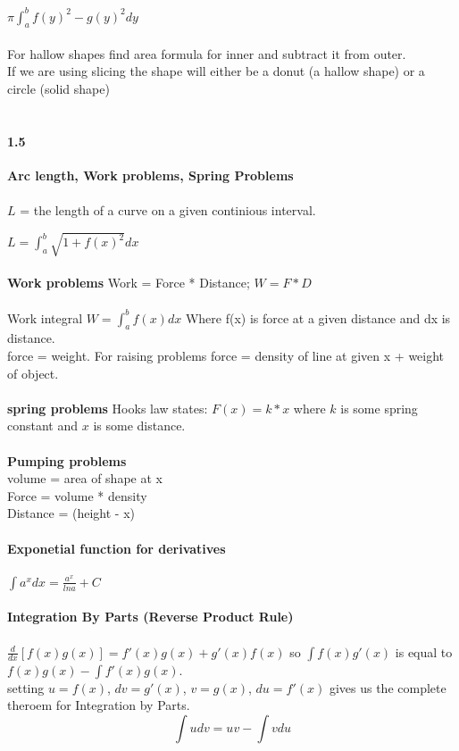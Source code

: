\documentclass[14pt]{extreport}
\begin{document}
$\pi \int_{a}^{b} f(y)^2 -g(y)^2dy$\\\\

For hallow shapes find area formula for inner and subtract it from outer.\\
If we are using slicing the shape will either be a donut (a hallow shape) or a circle (solid shape)\\\\

\paragraph{1.5} \textbf{Arc length, Work problems, Spring Problems}\\\\
$L$ = the length of a curve on a given continious interval.

$L = \int_{a}^{b} \sqrt{1+f(x)^2}dx$\\\\

\textbf{Work problems}
Work = Force * Distance; $W = F * D$\\\\
Work integral $W = \int_{a}^{b} f(x)dx$ Where f(x) is force at a given distance and dx is distance.\\
force = weight. For raising problems force = density of line at given x + weight of object.\\\\

\textbf{spring problems}
Hooks law states: $F(x) = k * x$ where $k$ is some spring constant and $x$ is some distance.\\\\

\textbf{Pumping problems}\\
volume = area of shape at x\\
Force = volume * density\\
Distance = (height - x)\\\\

\textbf{Exponetial function for derivatives}\\\\
$\int a^x dx = \frac{a^x}{ln a} + C$\\\\

\textbf{Integration By Parts (Reverse Product Rule)}\\\\
$\frac{d}{dx}[ f(x)g(x) ] = f'(x)g(x) + g'(x)f(x)$ so $\int f(x)g'(x)$ is equal to $f(x)g(x) - \int f'(x)g(x)$.\\
setting $u=f(x)$, $dv=g'(x)$, $v=g(x)$, $du=f'(x)$ gives us the complete theroem for Integration by Parts.\\
$$\int udv = uv - \int vdu$$\\
\end{document}
